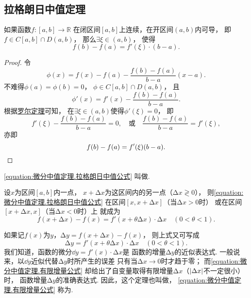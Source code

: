 \subsection{拉格朗日中值定理}
\begin{theorem}[拉格朗日中值定理]\label{theorem:微分中值定理.拉格朗日中值定理}
如果函数\(f\colon[a,b]\to\mathbb{R}\)
在闭区间\([a,b]\)上连续，在开区间\((a,b)\)内可导，
即\(f \in C[a,b] \cap D(a,b)\)，
那么\(\exists \xi \in (a,b)\)，
使得\begin{equation}\label{equation:微分中值定理.拉格朗日中值公式}
	f(b) - f(a) = f'(\xi) \cdot (b-a).
\end{equation}
\begin{proof}
令\[
	\phi(x)=f(x)-f(a)-\frac{f(b)-f(a)}{b-a}(x-a).
\]
不难得\(\phi(a)=\phi(b)=0\)，
\(\phi\in C[a,b]\cap D(a,b)\)，
且\[
	\phi'(x)=f'(x)-\frac{f(b)-f(a)}{b-a}.
\]
根据\hyperref[theorem:微分中值定理.罗尔定理]{罗尔定理}可知，
在\(\exists\xi\in(a,b)\)使得\(\phi'(\xi)=0\)，
即\[
	f'(\xi)-\frac{f(b)-f(a)}{b-a}=0,
	\quad\text{或}\quad
	\frac{f(b)-f(a)}{b-a}=f'(\xi),
\]
亦即\[
	f(b)-f(a)=f'(\xi)(b-a).
	\qedhere
\]
\end{proof}
\end{theorem}
\cref{equation:微分中值定理.拉格朗日中值公式} 叫做.

设\(x\)为区间\([a,b]\)内一点，
\(x+\increment x\)为这区间内的另一点（\(\increment x \gtrless 0\)），
则\cref{equation:微分中值定理.拉格朗日中值公式}
在区间\([x,x+\increment x]\)（当\(\increment x>0\)时）
或在区间\([x+\increment x,x]\)（当\(\increment x<0\)时）上
就成为\begin{equation}
	f(x+\increment x) - f(x)
	= f'(x+\theta \increment x) \cdot \increment x
	\quad(0<\theta<1).
\end{equation}

如果记\(f(x)\)为\(y\)，\(\increment y = f(x+\increment x) - f(x)\)，
则上式又可写成
\begin{equation}\label{equation:微分中值定理.有限增量公式}
	\increment y = f'(x+\theta \increment x) \cdot \increment x
	\quad(0<\theta<1).
\end{equation}
我们知道，函数的微分\(\dd{y} = f'(x) \cdot \increment x\)是
函数的增量\(\increment y\)的近似表达式.
一般说来，以\(\dd{y}\)近似代替\(\increment y\)时所产生的误差
只有当\(\increment x\to0\)时才趋于零；
而\cref{equation:微分中值定理.有限增量公式}
却给出了自变量取得有限增量\(\increment x\)（\(\abs{\Delta x}\)不一定很小）时，
函数增量\(\increment y\)的准确表达式.
因此，这个定理也叫做，
\cref{equation:微分中值定理.有限增量公式} 称为.

